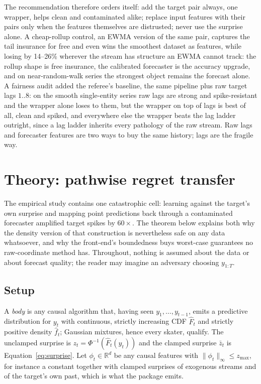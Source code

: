 \documentclass[article]{jss}
\theoremstyle{remark}
\newcommand{\R}{\mathbb{R}}
\newcommand{\zmax}{z_{\max}}
\begin{document}
The recommendation therefore orders itself: add the target pair always, one
wrapper, helps clean and contaminated alike; replace input features with
their pairs only when the features themselves are distrusted; never use the
surprise alone. A cheap-rollup control, an EWMA version of the same pair,
captures the tail insurance for free and even wins the smoothest dataset as
features, while losing by 14--26\% wherever the stream has structure an EWMA
cannot track: the rollup shape is free insurance, the calibrated forecaster
is the accuracy upgrade, and on near-random-walk series the strongest object
remains the forecast alone. A fairness audit added the referee's baseline, the same
pipeline plus raw target lags $1..8$: on the smooth single-entity series raw
lags are strong and spike-resistant and the wrapper alone loses to them, but
the wrapper on top of lags is best of all, clean and spiked, and everywhere
else the wrapper beats the lag ladder outright, since a lag ladder inherits
every pathology of the raw stream. Raw lags and forecaster features are two
ways to buy the same history; lags are the fragile way.

\section{Theory: pathwise regret transfer} \label{sec:theory}

The empirical study contains one catastrophic cell: learning against the
target's own surprise and mapping point predictions back through a
contaminated forecaster amplified target spikes by $60\times$. The theorem
below explains both why the density version of that construction is
nevertheless safe on any data whatsoever, and why the front-end's boundedness
buys worst-case guarantees no raw-coordinate method has. Throughout, nothing
is assumed about the data or about forecast quality; the reader may imagine
an adversary choosing $y_{1:T}$.

\subsection{Setup}

A \emph{body} is any causal algorithm that, having seen $y_1, \dots,
y_{t-1}$, emits a predictive distribution for $y_t$ with continuous, strictly
increasing CDF $\hat F_t$ and strictly positive density $\hat f_t$; Gaussian
mixtures, hence every skater, qualify. The unclamped surprise is $z_t =
\Phi^{-1}(\hat F_t(y_t))$ and the clamped surprise $\bar z_t$ is
Equation~\ref{eq:surprise}. Let $\phi_t \in \R^d$ be any causal features with
$\|\phi_t\|_\infty \le \zmax$, for instance a constant together with clamped
surprises of exogenous streams and of the target's own past, which is what
the package emits.
\end{document}
